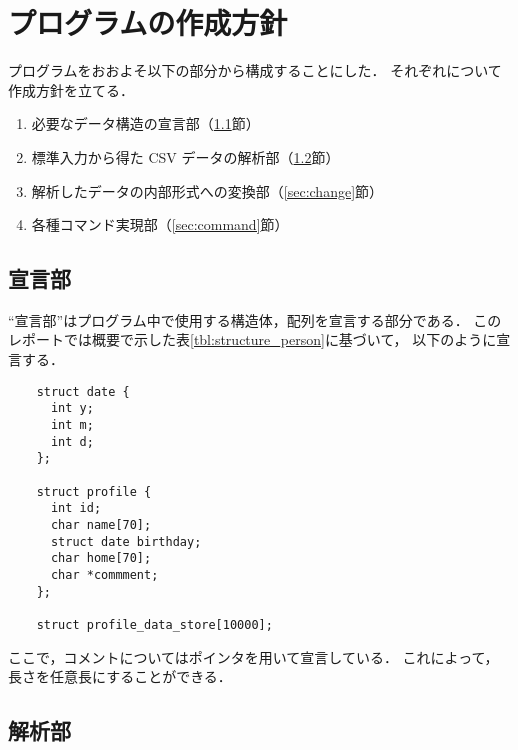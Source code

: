 \documentclass[a4paper,11pt]{jarticle}
\begin{document}
\section{プログラムの作成方針}

プログラムをおおよそ以下の部分から構成することにした．
それぞれについて作成方針を立てる．

\begin{enumerate}
\setlength{\parskip}{2pt} \setlength{\itemsep}{2pt}
    \item 必要なデータ構造の宣言部（\ref{sec:declare}節）
    \item 標準入力から得た CSV データの解析部（\ref{sec:parse}節）
    \item 解析したデータの内部形式への変換部（\ref{sec:change}節）
    \item 各種コマンド実現部（\ref{sec:command}節）
\end{enumerate}


\subsection{宣言部} \label{sec:declare}

``宣言部''はプログラム中で使用する構造体，配列を宣言する部分である．
このレポートでは概要で示した表\ref{tbl:structure_person}に基づいて，
以下のように宣言する．

{\fontsize{10pt}{11pt} \selectfont
\begin{verbatim}
    struct date {
      int y;
      int m;
      int d;
    };

    struct profile {
      int id;
      char name[70];
      struct date birthday;
      char home[70];
      char *commment;
    };

    struct profile_data_store[10000];
\end{verbatim}
}

ここで，コメントについてはポインタを用いて宣言している．
これによって，長さを任意長にすることができる．

\subsection{解析部} \label{sec:parse}
\end{document}
